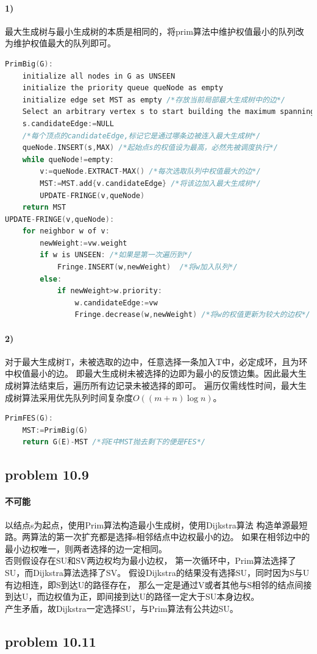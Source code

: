 \documentclass[11pt,a4paper,oneside,oldfontcommands]{ctexart}
\begin{document}
\paragraph*{1)}
最大生成树与最小生成树的本质是相同的，将prim算法中维护权值最小的队列改为维护权值最大的队列即可。
\begin{lstlisting}[language=C++,title=PrimBig.func]
PrimBig(G):
	initialize all nodes in G as UNSEEN
	initialize the priority queue queNode as empty
	initialize edge set MST as empty /*存放当前局部最大生成树中的边*/
	Select an arbitrary vertex s to start building the maximum spanning tree
	s.candidateEdge:=NULL 
	/*每个顶点的candidateEdge,标记它是通过哪条边被连入最大生成树*/
	queNode.INSERT(s,MAX) /*起始点s的权值设为最高，必然先被调度执行*/
	while queNode!=empty:
		v:=queNode.EXTRACT-MAX() /*每次选取队列中权值最大的边*/
		MST:=MST.add{v.candidateEdge} /*将该边加入最大生成树*/
		UPDATE-FRINGE(v,queNode)
	return MST
UPDATE-FRINGE(v,queNode):
	for neighbor w of v:
		newWeight:=vw.weight
		if w is UNSEEN: /*如果是第一次遍历到*/
			Fringe.INSERT(w,newWeight)  /*将w加入队列*/
		else:
			if newWeight>w.priority:
				w.candidateEdge:=vw
				Fringe.decrease(w,newWeight) /*将w的权值更新为较大的边权*/
\end{lstlisting}
\paragraph*{2)}
对于最大生成树T，未被选取的边中，任意选择一条加入T中，必定成环，且为环中权值最小的边。
即最大生成树未被选择的边即为最小的反馈边集。因此最大生成树算法结束后，遍历所有边记录未被选择的即可。
遍历仅需线性时间，最大生成树算法采用优先队列时间复杂度$O((m+n)\log n)$。
\begin{lstlisting}[language=C++,title=PrimFES.func]
PrimFES(G):
	MST:=PrimBig(G)
	return G(E)-MST /*将E中MST抛去剩下的便是FES*/
\end{lstlisting}
{\subsection*{problem 10.9}}
\paragraph*{不可能}以结点s为起点，使用Prim算法构造最小生成树，使用Dijkstra算法
构造单源最短路。两算法的第一次扩充都是选择s相邻结点中边权最小的边。
如果在相邻边中的最小边权唯一，则两者选择的边一定相同。\\
\hspace*{20pt}否则假设存在SU和SV两边权均为最小边权，
第一次循环中，Prim算法选择了SU，而Dijkstra算法选择了SV。
假设Dijkstra的结果没有选择SU，同时因为S与U有边相连，即S到达U的路径存在，
那么一定是通过V或者其他与S相邻的结点间接到达U，而边权值为正，即间接到达U的路径一定大于SU本身边权。
\\\hspace*{20pt}产生矛盾，故Dijkstra一定选择SU，与Prim算法有公共边SU。
\newpage
{\subsection*{problem 10.11}}
\end{document}
